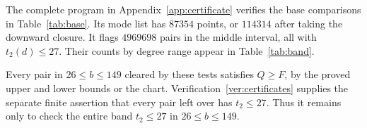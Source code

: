 \begin{verification}\label{ver:certificates}
The complete program in Appendix~\ref{app:certificate} verifies the
base comparisons in Table~\ref{tab:base}. Its mode list has \(87354\)
points, or \(114314\) after taking the downward closure. It flags
\(4969698\) pairs in the middle interval, all with \(t_2(d)\le27\).
Their counts by degree range appear in Table~\ref{tab:band}.
\end{verification}

Every pair in \(26\le b\le149\) cleared by these tests satisfies
\(Q\ge F\), by the proved upper and lower bounds or the chart.
Verification~\ref{ver:certificates}
supplies the separate finite assertion that every pair left over has
\(t_2\le27\). Thus it remains only to check the entire band
\(t_2\le27\) in \(26\le b\le149\).
